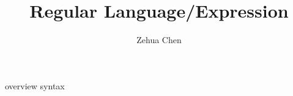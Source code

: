 \documentclass{report}
\title{Regular Language/Expression}
\author{Zehua Chen}
\begin{document}
  \maketitle
  \tableofcontents

  {overview}
  {syntax}
\end{document}

